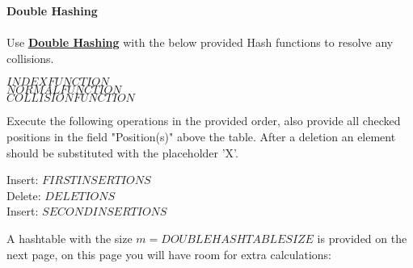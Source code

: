 \documentclass[12pt]{article}
\begin{document}
    \textbf{\LARGE{\color{tumgadRed} Double Hashing}}\\
    \\
    \noindent
    Use \href{https://sebastianoner.github.io/TUMGAD/src/Algorithms/Hashing/Double/DoubleHashing}{\textbf{\underline{Double Hashing}}} with
    the below provided Hash functions to resolve any collisions.
    \begin{center}
        $INDEXFUNCTION$\\
        $NORMALFUNCTION$\\
        $COLLISIONFUNCTION$\\
    \end{center}
    Execute the following operations in the provided order, also provide all checked positions in the field "Position(s)" above the table.
    After a deletion an element should be substituted with the placeholder 'X'.\\
    \begin{center}
        Insert: $FIRSTINSERTIONS$\\
        Delete: $DELETIONS$\\
        Insert: $SECONDINSERTIONS$\\
    \end{center}
    A hashtable with the size $m = DOUBLEHASHTABLESIZE$ is provided on the next page, on this page you will have room for extra calculations:\\
    \newline
    \noindent{}
    \newpage
\end{document}
